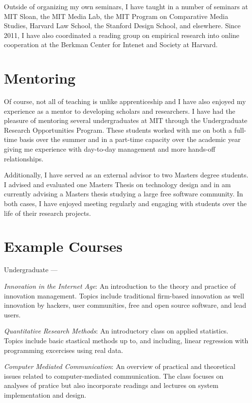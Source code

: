 \documentclass[10pt]{memoir}
\newenvironment{enumerate*}%
  {\begin{enumerate}%
    \setlength{\itemsep}{0pt}%
    \setlength{\parskip}{0pt}}%
  {\end{enumerate}}
\begin{document}
Outside of organizing my own seminars, I have taught in a number of
seminars at MIT Sloan, the MIT Media Lab, the MIT Program on
Comparative Media Studies, Harvard Law School, the Stanford Design
School, and elsewhere. Since 2011, I have also coordinated a reading
group on empirical research into online cooperation at the Berkman
Center for Intenet and Society at Harvard.

\section{Mentoring}

Of course, not all of teaching is unlike apprenticeship and I have
also enjoyed my experience as a mentor to developing scholars and
researchers. I have had the pleasure of mentoring several
undergraduates at MIT through the Undergraduate Research Opportunities
Program. These students worked with me on both a full-time basis over
the summer and in a part-time capacity over the academic year giving
me experience with day-to-day management and more hands-off
relationships.

Additionally, I have served as an external advisor to two Masters
degree students. I advised and evaluated one Masters Thesis on
technology design and in am currently advising a Masters thesis
studying a large free software community. In both cases, I have
enjoyed meeting regularly and engaging with students over the life of
their research projects.

\section{Example Courses}

Undergraduate ---

\begin{enumerate*}
\item \emph{Innovation in the Internet Age}: An introduction to the
  theory and practice of innovation management. Topics include
  traditional firm-based innovation as well innovation by hackers,
  user communities, free and open source software, and lead users.
\item \emph{Quantitative Research Methods}: An introductory class on
  applied statistics. Topics include basic stastical methods up to,
  and including, linear regression with programming excercises using
  real data.
\item \emph{Computer Mediated Communication}: An overview of practical
  and theoretical issues related to computer-mediated
  communication. The class focuses on analyses of pratice but also
  incorporate readings and lectures on system implementation and
  design.
\end{enumerate*}
\end{document}
